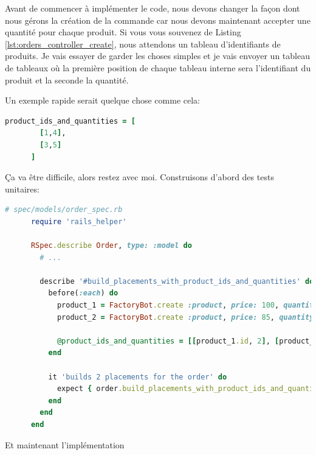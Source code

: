 \documentclass[]{report}
\begin{document}
    Avant de commencer à implémenter le code, nous devons changer la façon dont nous gérons la création de la commande car nous devons maintenant accepter une quantité pour chaque produit. Si vous vous souvenez de Listing \ref{lst:orders_controller_create}, nous attendons un tableau d'identifiants de produits. Je vais essayer de garder les choses simples et je vais envoyer un tableau de tableaux où la première position de chaque tableau interne sera l'identifiant du produit et la seconde la quantité.

    Un exemple rapide serait quelque chose comme cela:

    \begin{scriptsize}
      \begin{lstlisting}[language=ruby]
      product_ids_and_quantities = [
        [1,4],
        [3,5]
      ]
      \end{lstlisting}
    \end{scriptsize}

    Ça va être difficile, alors restez avec moi. Construisons d'abord des tests unitaires:

    \begin{scriptsize}
      \begin{lstlisting}[language=ruby]
      # spec/models/order_spec.rb
      require 'rails_helper'

      RSpec.describe Order, type: :model do
        # ...

        describe '#build_placements_with_product_ids_and_quantities' do
          before(:each) do
            product_1 = FactoryBot.create :product, price: 100, quantity: 5
            product_2 = FactoryBot.create :product, price: 85, quantity: 10

            @product_ids_and_quantities = [[product_1.id, 2], [product_2.id, 3]]
          end

          it 'builds 2 placements for the order' do
            expect { order.build_placements_with_product_ids_and_quantities(@product_ids_and_quantities) }.to change { order.placements.size }.from(0).to(2)
          end
        end
      end
      \end{lstlisting}
    \end{scriptsize}

    Et maintenant l'implémentation
\end{document}
